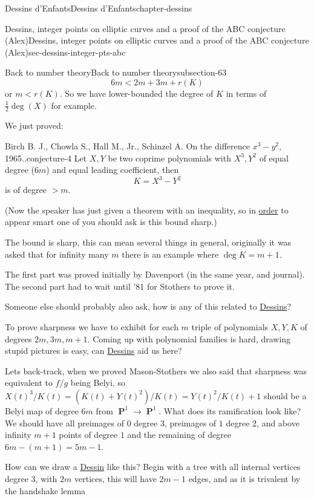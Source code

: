 \documentclass[oneside,10pt,]{book}
\numberwithin{equation}{section}
\DeclareMathOperator{\PP}{\mathbf{P}}
\newcommand{\lt}{<}
\newcommand{\gt}{>}
\begin{document}
\begin{chapterptx}{Dessins d'Enfants}{}{Dessins d'Enfants}{}{}{chapter-dessins}
\begin{sectionptx}{Dessins, integer points on elliptic curves and a proof of the ABC conjecture (Alex)}{}{Dessins, integer points on elliptic curves and a proof of the ABC conjecture (Alex)}{}{}{sec-dessins-integer-pts-abc}
\begin{subsectionptx}{Back to number theory}{}{Back to number theory}{}{}{subsection-63}
\begin{equation*}
6m \lt 2m + 3m + r(K)
\end{equation*}
or \(m \lt r(K)\). So we have lower-bounded the degree of \(K\) in terms of \(\frac 12 \deg(X)\) for example.%
\par
\hypertarget{p-720}{}%
We just proved:%
\begin{conjecture}{Birch B. J., Chowla S., Hall M., Jr., Schinzel A. On the difference \(x^3 - y^2\), 1965..}{}{conjecture-4}%
\hypertarget{p-721}{}%
Let \(X, Y\) be two coprime polynomials with \(X^3,Y^2\) of equal degree (\(6m\)) and equal leading coefficient, then%
\begin{equation*}
K = X^3 - Y^2
\end{equation*}
is of degree \(\gt m\).%
\par
\hypertarget{p-722}{}%
(Now the speaker has just given a theorem with an inequality, so in \hyperref[def-order-quaternion]{order} to appear smart one of you should ask is this bound sharp.)%
\par
\hypertarget{p-723}{}%
The bound is sharp, this can mean several things in general, originally it was asked that for infinity many \(m\) there is an example where \(\deg K = m + 1\).%
\end{conjecture}
\hypertarget{p-724}{}%
The first part was proved initially by Davenport (in the same year, and journal). The second part had to wait until '81 for Stothers to prove it.%
\par
\hypertarget{p-725}{}%
Someone else should probably also ask, how is any of this related to \hyperref[def-dessin-denfant]{Dessins}?%
\par
\hypertarget{p-726}{}%
To prove sharpness we have to exhibit for each \(m\) triple of polynomials \(X,Y,K\) of degrees \(2m,3m,m+1\). Coming up with polynomial families is hard, drawing stupid pictures is easy, can \hyperref[def-dessin-denfant]{Dessins} aid us here?%
\par
\hypertarget{p-727}{}%
Lets back-track, when we proved Mason-Stothers we also said that sharpness was equivalent to \(f/g\) being Belyi, so \(X(t)^3/K(t) = (K(t) + Y(t)^2) / K(t) = Y(t)^2/K(t) + 1\) should be a Belyi map of degree \(6m\) from \(\PP^1\to \PP^1\). What does its ramification look like? We should have all preimages of \(0\) degree 3, preimages of \(1\) degree 2, and above infinity \(m + 1\) points of degree \(1\) and the remaining of degree \(6m - (m + 1) = 5m - 1\).%
\par
\hypertarget{p-728}{}%
How can we draw a \hyperref[def-dessin-denfant]{Dessin} like this? Begin with a tree with all internal vertices degree 3, with \(2m\) vertices, this will have \(2m - 1\) edges, and as it is trivalent by the handshake lemma%

\end{subsectionptx}
\end{sectionptx}
\end{chapterptx}
\end{document}
